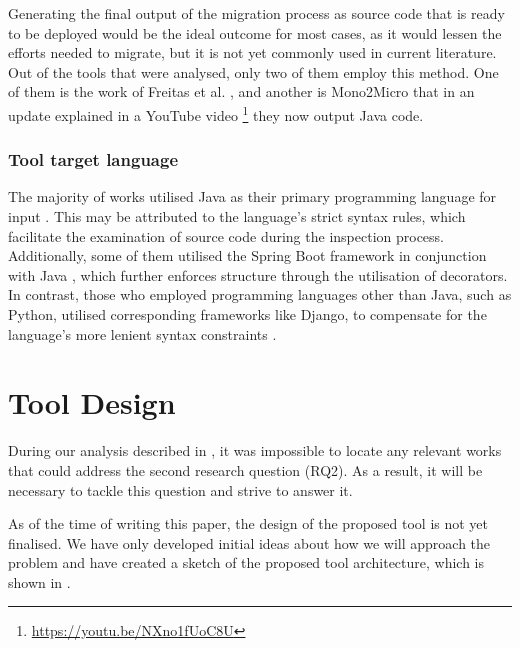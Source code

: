 \documentclass[conference]{IEEEtran}
\begin{document}
Generating the final output of the migration process as source code that is
ready to be deployed would be the ideal outcome for most cases, as it would
lessen the efforts needed to migrate, but it is not yet commonly used in
current literature. Out of the tools that were analysed, only two of them
employ this method. One of them is the work of Freitas et al.
, and another is Mono2Micro
 that in an update explained in a YouTube video
\footnote{\url{https://youtu.be/NXno1fUoC8U}} they now output Java code.

\subsubsection{Tool target language}

The majority of works utilised Java as their primary programming language for
input . This may be
attributed to the language's strict syntax rules, which facilitate the
examination of source code during the inspection process. Additionally, some of
them utilised the Spring Boot framework in conjunction with Java
, which
further enforces structure through the utilisation of decorators. In contrast,
those who employed programming languages other than Java, such as Python,
utilised corresponding frameworks like Django, to compensate for the language's
more lenient syntax constraints .

\section{Tool Design}

During our analysis described in , it was
impossible to locate any relevant works that could address the second research
question (RQ2). As a result, it will be necessary to tackle this question and
strive to answer it.

As of the time of writing this paper, the design of the proposed tool is not
yet finalised. We have only developed initial ideas about how we will approach
the problem and have created a sketch of the proposed tool architecture, which
is shown in .
\end{document}
